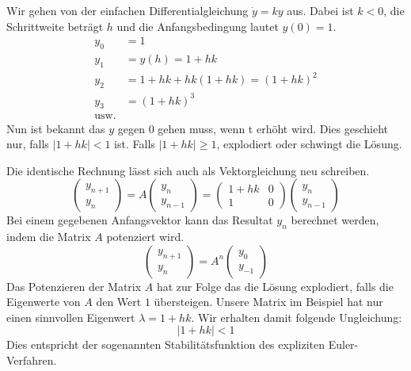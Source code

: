 Wir gehen von der einfachen Differentialgleichung $\dot{y}=ky$ aus.
Dabei ist $k < 0$, die Schrittweite beträgt $h$ und die Anfangsbedingung lautet $y(0) = 1$.
\begin{align}
	y_0 &= 1\\
	y_1 &= y(h) = 1 + hk\\
	y_2 &= 1 + hk + hk(1+hk) = (1+hk)^2\\
	y_3 &= (1+hk)^3\\
	\text{usw.}
\end{align} 
Nun ist bekannt das $y$ gegen $0$ gehen muss, wenn t erhöht wird.
Dies geschieht nur, falls $\vert 1+hk \vert < 1$ ist.
Falls $\vert 1+hk \vert \ge 1$, explodiert oder schwingt die Lösung.

Die identische Rechnung lässt sich auch als Vektorgleichung neu schreiben.
\begin{equation}
	\left( \begin{array}{c}y_{n+1} \\ y_n \end{array} \right) = A \left( \begin{array}{c}y_n \\ y_{n-1} \end{array} \right) = \begin{pmatrix} 
	1+hk & 0 \\
	1 & 0
	\end{pmatrix}\left( \begin{array}{c}y_n \\ y_{n-1} \end{array} \right)
\end{equation}
Bei einem gegebenen Anfangsvektor kann das Resultat $y_n$ berechnet werden, indem die Matrix $A$ potenziert wird.
\begin{equation}
\left( \begin{array}{c}y_{n+1} \\ y_n \end{array} \right) = A^n \left( \begin{array}{c}y_0 \\ y_{-1} \end{array} \right)
\end{equation}
Das Potenzieren der Matrix $A$ hat zur Folge das die Lösung explodiert, falls die Eigenwerte von $A$ den Wert $1$ übersteigen.
Unsere Matrix im Beispiel hat nur einen sinnvollen Eigenwert $\lambda = 1+hk$.
Wir erhalten damit folgende Ungleichung:
\begin{equation}
	\vert 1+hk \vert < 1
\end{equation}
Dies entspricht der sogenannten Stabilitätsfunktion des expliziten Euler-Verfahren.


